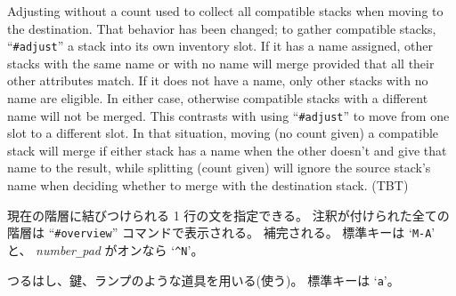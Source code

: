 Adjusting without a count used to collect all compatible stacks when
moving to the destination.  That behavior has been changed; to gather
compatible stacks, ``{\tt \#adjust}'' a stack into its own inventory slot.
If it has a name assigned, other stacks with the same name or with
no name will merge provided that all their other attributes match.
If it does not have a name, only other stacks with no name are eligible.
In either case, otherwise compatible stacks with a different name
will not be merged.  This contrasts with using ``{\tt \#adjust}'' to move
from one slot to a different slot.  In that situation, moving (no
count given) a compatible stack will merge if either stack has a
name when the other doesn't and give that name to the result, while
splitting (count given) will ignore the source stack's name when
deciding whether to merge with the destination stack.
(TBT)
\item[\tb{\#annotate}]
現在の階層に結びつけられる 1 行の文を指定できる。
注釈が付けられた全ての階層は
``{\tt \#overview}'' コマンドで表示される。
補完される。
標準キーは `{\tt M-A}' と、
{\it number\verb+_+pad\/} がオンなら `{\tt \^{}N}'。
\item[\tb{\#apply}]
つるはし、鍵、ランプのような道具を用いる(使う)。
標準キーは `{\tt a}'。\\
